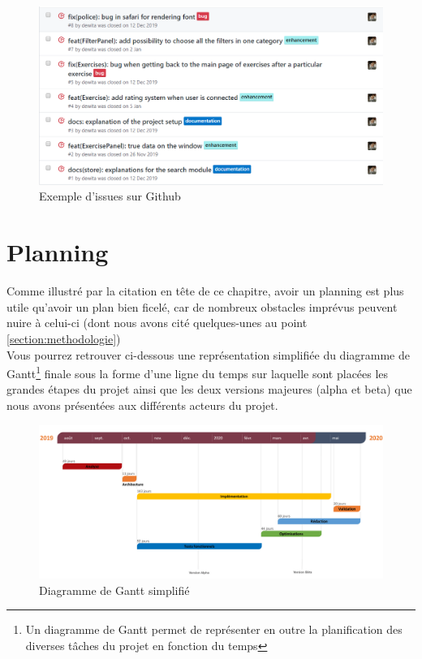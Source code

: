 \begin{figure}[H]
    \includegraphics[width=\textwidth,height=\textheight,keepaspectratio]{images/approche/issueList.PNG}
    \centering
    \caption{Exemple d'issues sur Github}
    \label{pic:GithubIssues}
\end{figure}

\section{Planning}
Comme illustré par la citation en tête de ce chapitre, avoir un planning est plus utile qu'avoir un plan bien ficelé, car de nombreux obstacles imprévus peuvent nuire à celui-ci (dont nous avons cité quelques-unes au point  \ref{section:methodologie})\\

Vous pourrez retrouver ci-dessous une représentation simplifiée du diagramme de Gantt\footnote{Un diagramme de Gantt permet de représenter en outre la planification des diverses tâches du projet en fonction du temps } finale sous la forme d'une ligne du temps sur laquelle sont placées les grandes étapes du projet ainsi que les deux versions majeures (alpha et beta) que nous avons présentées aux différents acteurs du projet.\\

\begin{figure}[H]
    \includegraphics[width=\textwidth,height=\textheight,keepaspectratio]{images/approche/planning.png}
    \centering
    \caption{Diagramme de Gantt simplifié}
    \label{pic:ganttChart}
\end{figure}

